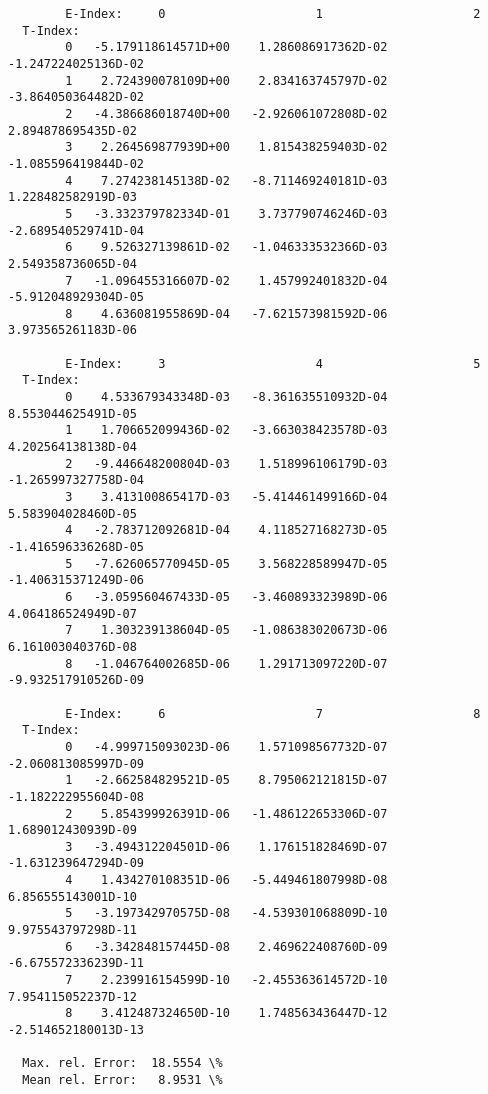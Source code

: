 \documentclass[12pt,dvipdfmx]{article}
\begin{document}
{\begin{small}\begin{verbatim}
        E-Index:     0                     1                     2
  T-Index:
        0   -5.179118614571D+00    1.286086917362D-02   -1.247224025136D-02
        1    2.724390078109D+00    2.834163745797D-02   -3.864050364482D-02
        2   -4.386686018740D+00   -2.926061072808D-02    2.894878695435D-02
        3    2.264569877939D+00    1.815438259403D-02   -1.085596419844D-02
        4    7.274238145138D-02   -8.711469240181D-03    1.228482582919D-03
        5   -3.332379782334D-01    3.737790746246D-03   -2.689540529741D-04
        6    9.526327139861D-02   -1.046333532366D-03    2.549358736065D-04
        7   -1.096455316607D-02    1.457992401832D-04   -5.912048929304D-05
        8    4.636081955869D-04   -7.621573981592D-06    3.973565261183D-06

        E-Index:     3                     4                     5
  T-Index:
        0    4.533679343348D-03   -8.361635510932D-04    8.553044625491D-05
        1    1.706652099436D-02   -3.663038423578D-03    4.202564138138D-04
        2   -9.446648200804D-03    1.518996106179D-03   -1.265997327758D-04
        3    3.413100865417D-03   -5.414461499166D-04    5.583904028460D-05
        4   -2.783712092681D-04    4.118527168273D-05   -1.416596336268D-05
        5   -7.626065770945D-05    3.568228589947D-05   -1.406315371249D-06
        6   -3.059560467433D-05   -3.460893323989D-06    4.064186524949D-07
        7    1.303239138604D-05   -1.086383020673D-06    6.161003040376D-08
        8   -1.046764002685D-06    1.291713097220D-07   -9.932517910526D-09

        E-Index:     6                     7                     8
  T-Index:
        0   -4.999715093023D-06    1.571098567732D-07   -2.060813085997D-09
        1   -2.662584829521D-05    8.795062121815D-07   -1.182222955604D-08
        2    5.854399926391D-06   -1.486122653306D-07    1.689012430939D-09
        3   -3.494312204501D-06    1.176151828469D-07   -1.631239647294D-09
        4    1.434270108351D-06   -5.449461807998D-08    6.856555143001D-10
        5   -3.197342970575D-08   -4.539301068809D-10    9.975543797298D-11
        6   -3.342848157445D-08    2.469622408760D-09   -6.675572336239D-11
        7    2.239916154599D-10   -2.455363614572D-10    7.954115052237D-12
        8    3.412487324650D-10    1.748563436447D-12   -2.514652180013D-13

  Max. rel. Error:  18.5554 \%
  Mean rel. Error:   8.9531 \%


\end{verbatim}
\end{small}}
\end{document}
